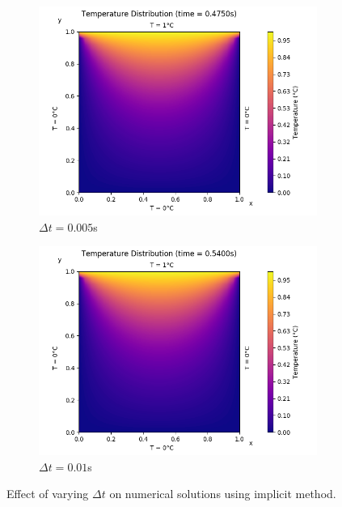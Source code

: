 \documentclass[a4paper]{article}
\begin{document}
\begin{figure}[H]
			\medskip
			\begin{subfigure}{0.48\textwidth}
				\includegraphics[width=\linewidth]{figures/1a_implicit_dt_varies/3)dt=5000ns.png}
				\caption{$\Delta t = 0.005$s}
			\end{subfigure}\hspace*{\fill}
			\begin{subfigure}{0.48\textwidth}
				\includegraphics[width=\linewidth]{figures/1a_implicit_dt_varies/4)dt=10000ns.png}
				\caption{$\Delta t = 0.01$s}
			\end{subfigure}
			
			\caption{Effect of varying $\Delta t$ on numerical solutions using implicit method.} \label{solution_1a_implicit_dt_varies}
		\end{figure}
	
\end{document}
